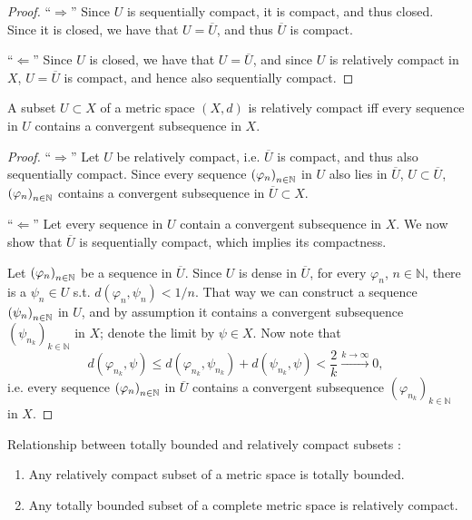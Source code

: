 \begin{proof}
	\enquote{$\Longrightarrow$} Since $U$ is sequentially compact, it is compact, and thus closed. Since it is closed, we have that $U = \overline{U}$, and thus $\overline{U}$ is compact.
	
	\enquote{$\Longleftarrow$} Since $U$ is closed, we have that $U = \overline{U}$, and since $U$ is relatively compact in $X$, $U = \overline{U}$ is compact, and hence also sequentially compact.
\end{proof}

\begin{theorem}
	A subset $U\subset X$ of a metric space $(X, d)$ is relatively compact iff every sequence in $U$ contains a convergent subsequence in $X$.
\end{theorem}

\begin{proof}
	\enquote{$\Longrightarrow$} Let $U$ be relatively compact, i.e. $\overline{U}$ is compact, and thus also sequentially compact. Since every sequence $\seq[\varphi_n]$ in $U$ also lies in $\overline{U}$, $U\subset \overline{U}$, $\seq[\varphi_n]$ contains a convergent subsequence in $\overline{U}\subset X$.
	
	\enquote{$\Longleftarrow$} Let every sequence in $U$ contain a convergent subsequence in $X$. We now show that $\overline{U}$ is sequentially compact, which implies its compactness.
	
	Let $\seq[\varphi_n]$ be a sequence in $\overline{U}$. Since $U$ is dense in $\overline{U}$, for every $\varphi_n$, $n\in\mathbb N$, there is a $\psi_n\in U$ s.t. $d(\varphi_n, \psi_n) < 1/n$. That way we can construct a sequence $\seq[\psi_n]$ in $U$, and by assumption it contains a convergent subsequence $\left(\psi_{n_k}\right)_{k\in\mathbb N}$ in $X$; denote the limit by $\psi\in X$. Now note that
	$$d(\varphi_{n_k}, \psi) \leq d(\varphi_{n_k}, \psi_{n_k}) + d(\psi_{n_k}, \psi) < \frac{2}{k} \overset{k\to\infty}{\longrightarrow} 0,$$ i.e. every sequence $\seq[\varphi_n]$ in $\overline{U}$ contains a convergent subsequence $\left(\varphi_{n_k}\right)_{k\in\mathbb N}$ in $X$.
\end{proof}

\begin{theorem}
	Relationship between totally bounded and relatively compact subsets \cite[Theorem 4.27]{src:relative_compactness}:
	\begin{enumerate}[label=(\alph*)]
		\item Any relatively compact subset of a metric space is totally bounded.
		\item Any totally bounded subset of a complete metric space is relatively compact.
	\end{enumerate}
\end{theorem}

